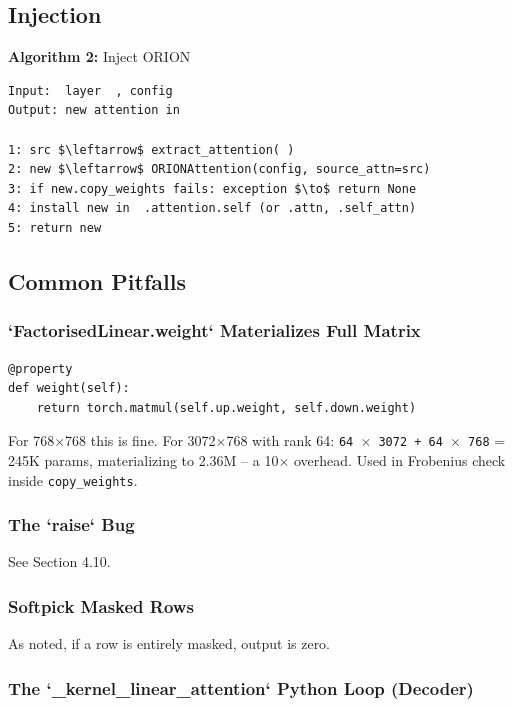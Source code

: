 \subsection{Injection}

\textbf{Algorithm 2:} Inject ORION
\begin{lstlisting}
Input:  layer  , config
Output: new attention in  

1: src $\leftarrow$ extract_attention( )
2: new $\leftarrow$ ORIONAttention(config, source_attn=src)
3: if new.copy_weights fails: exception $\to$ return None
4: install new in  .attention.self (or .attn, .self_attn)
5: return new
\end{lstlisting}

\subsection{Common Pitfalls}

\subsubsection{`FactorisedLinear.weight` Materializes Full Matrix}

\begin{lstlisting}
@property
def weight(self):
    return torch.matmul(self.up.weight, self.down.weight)
\end{lstlisting}

For 768$\times$768 this is fine. For 3072$\times$768 with rank 64: \texttt{64 $\times$ 3072 + 64 $\times$ 768} 
= 245K params, materializing to 2.36M -- a 10$\times$ overhead. Used in Frobenius 
check inside \texttt{copy\_weights}.

\subsubsection{The `raise` Bug}

See Section 4.10.

\subsubsection{Softpick Masked Rows}

As noted, if a row is entirely masked, output is zero.

\subsubsection{The `\_kernel\_linear\_attention` Python Loop (Decoder)}


